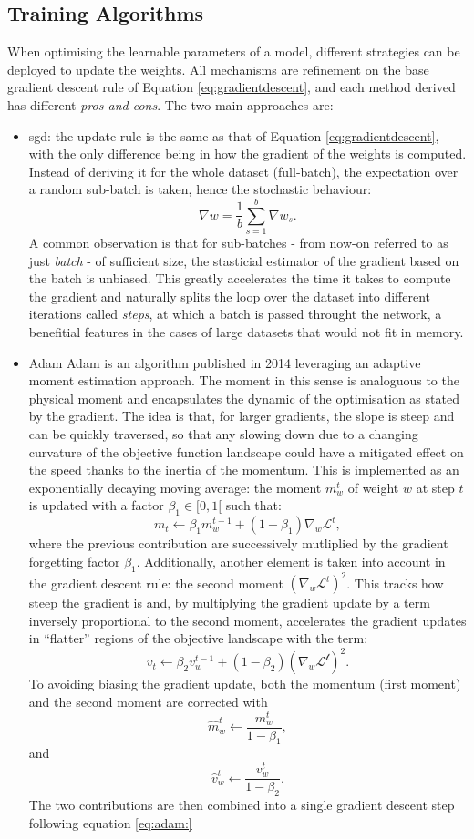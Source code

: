 \subsection{Training Algorithms}
When optimising the learnable parameters of a model, different strategies can be deployed to update the weights. All mechanisms are refinement on the base gradient descent rule of Equation \ref{eq:gradientdescent}, and each method derived has different \textit{pros and cons}. The two main approaches are: 
\begin{itemize}
    \item \gls{sgd}: the update rule is the same as that of Equation \ref{eq:gradientdescent}, with the only difference being in how the gradient of the weights is computed. Instead of deriving it for the whole dataset (full-batch), the expectation over a random sub-batch is taken, hence the stochastic behaviour: \[ \nabla w = \frac{1}{b} \sum_{s=1}^b \nabla w_s.\] A common observation is that for sub-batches - from now-on referred to as just \textit{batch} - of sufficient size, the stasticial estimator of the gradient based on the batch is unbiased. This greatly accelerates the time it takes to compute the gradient and naturally splits the loop over the dataset into different iterations called \textit{steps}, at which a batch is passed throught the network, a benefitial features in the cases of large datasets that would not fit in memory. 
    \item Adam \cite{adamPaper:} Adam is an algorithm published in 2014 leveraging an adaptive moment estimation approach. The moment in this sense is analoguous to the physical moment and encapsulates the dynamic of the optimisation as stated by the gradient. The idea is that, for larger gradients, the slope is steep and can be quickly traversed, so that any slowing down due to a changing curvature of the objective function landscape could have a mitigated effect on the speed thanks to the inertia of the momentum. This is implemented as an exponentially decaying moving average: the moment $m^t_w$ of weight $w$ at step $t$ is updated with a factor $\beta_1 \in [0, 1[$ such that: \[ m_t \leftarrow \beta_1 m^{t-1}_w + (1 - \beta_1) \nabla_w \mathcal{L}^t,\] where the previous contribution are successively mutliplied by the gradient forgetting factor $\beta_1$. Additionally, another element is taken into account in the gradient descent rule: the second moment $(\nabla_w \mathcal{L}^t)^2$. This tracks how steep the gradient is and, by multiplying the gradient update by a term inversely proportional to the second moment, accelerates the gradient updates in ``flatter'' regions of the objective landscape with the term: \[ v_t \leftarrow \beta_2 v^{t-1}_w + (1 - \beta_2) (\nabla_w \mathcal{L^t})^2.\] To avoiding biasing the gradient update, both the momentum (first moment) and the second moment are corrected with \[\hat{m}^t_w \leftarrow \frac{m^t_w}{1 - \beta_1},\] and \[\hat{v}^t_w \leftarrow \frac{v^t_w}{1 - \beta_2}.\] The two contributions are then combined into a single gradient descent step following equation \ref{eq:adam:}

\end{itemize}
